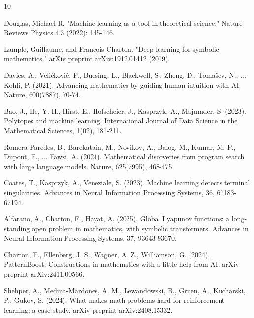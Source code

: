 \documentclass[reqno,11pt]{amsart}
\begin{document}
\begin{thebibliography}{10}


Douglas, Michael R. "Machine learning as a tool in theoretical science." Nature Reviews Physics 4.3 (2022): 145-146.

Lample, Guillaume, and François Charton. "Deep learning for symbolic mathematics." arXiv preprint arXiv:1912.01412 (2019).

Davies, A., Veli{\v{c}}kovi{\'c}, P., Buesing, L., Blackwell, S., Zheng, D., Tomašev, N., ...  Kohli, P. (2021). Advancing mathematics by guiding human intuition with AI. Nature, 600(7887), 70-74.

Bao, J., He, Y. H., Hirst, E., Hofscheier, J., Kasprzyk, A., Majumder, S. (2023). Polytopes and machine learning. International Journal of Data Science in the Mathematical Sciences, 1(02), 181-211.


Romera-Paredes, B., Barekatain, M., Novikov, A., Balog, M., Kumar, M. P., Dupont, E., ...  Fawzi, A. (2024). Mathematical discoveries from program search with large language models. Nature, 625(7995), 468-475.

Coates, T., Kasprzyk, A.,  Veneziale, S. (2023). Machine learning detects terminal singularities. Advances in Neural Information Processing Systems, 36, 67183-67194.

Alfarano, A., Charton, F.,  Hayat, A. (2025). Global Lyapunov functions: a long-standing open problem in mathematics, with symbolic transformers. Advances in Neural Information Processing Systems, 37, 93643-93670.

Charton, F., Ellenberg, J. S., Wagner, A. Z.,  Williamson, G. (2024). PatternBoost: Constructions in mathematics with a little help from AI. arXiv preprint arXiv:2411.00566.

Shehper, A., Medina-Mardones, A. M., Lewandowski, B., Gruen, A., Kucharski, P.,  Gukov, S. (2024). What makes math problems hard for reinforcement learning: a case study. arXiv preprint arXiv:2408.15332.


\end{thebibliography}
\end{document}
